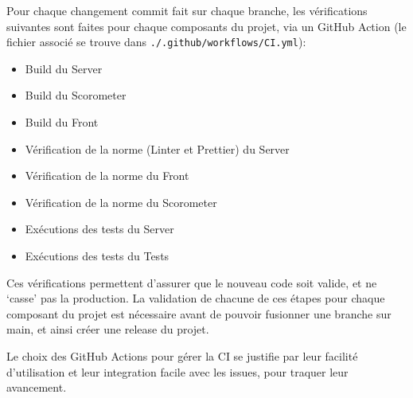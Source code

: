 Pour chaque changement commit fait sur chaque branche, les vérifications suivantes sont faites pour chaque composants du projet, via un GitHub Action (le fichier associé se trouve dans \verb|./.github/workflows/CI.yml|):

\begin{itemize}
	\item Build du Server
	\item Build du Scorometer
	\item Build du Front
	\item Vérification de la norme (Linter et Prettier) du Server
	\item Vérification de la norme du Front
	\item Vérification de la norme du Scorometer
	\item Exécutions des tests du Server
	\item Exécutions des tests du Tests
\end{itemize}


Ces vérifications permettent d’assurer que le nouveau code soit valide, et ne ‘casse’ pas la production.
La validation de chacune de ces étapes pour chaque composant du projet est nécessaire avant de pouvoir fusionner une branche sur main, et ainsi créer une release du projet.

Le choix des GitHub Actions pour gérer la CI se justifie par leur facilité d'utilisation et leur integration facile avec les issues, pour traquer leur avancement.